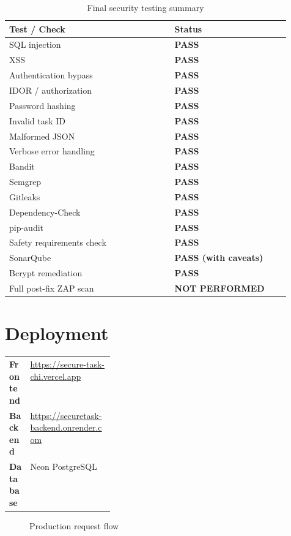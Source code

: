 \documentclass[11pt,a4paper]{article}
\newcommand{\tablehead}{\rowcolor{LightBlue}}
\newcommand{\pass}{\textcolor{PassGreen}{\textbf{PASS}}}
\newcommand{\passcav}{\textcolor{WarnAmber}{\textbf{PASS (with caveats)}}}
\newcommand{\notdone}{\textcolor{FailRed}{\textbf{NOT PERFORMED}}}
\begin{document}
\begin{table}[htbp]
\centering
\renewcommand{\arraystretch}{1.3}
\begin{tabular}{@{}L{0.5\linewidth}L{0.35\linewidth}@{}}
\toprule
\tablehead \textbf{Test / Check} & \textbf{Status} \\
\midrule
SQL injection & \pass \\
XSS & \pass \\
Authentication bypass & \pass \\
IDOR / authorization & \pass \\
Password hashing & \pass \\
Invalid task ID & \pass \\
Malformed JSON & \pass \\
Verbose error handling & \pass \\
\midrule
Bandit & \pass \\
Semgrep & \pass \\
Gitleaks & \pass \\
Dependency-Check & \pass \\
pip-audit & \pass \\
Safety requirements check & \pass \\
SonarQube & \passcav \\
Bcrypt remediation & \pass \\
Full post-fix ZAP scan & \notdone \\
\bottomrule
\end{tabular}
\caption{Final security testing summary}
\end{table}

\section{Deployment}

\begin{tabularx}{\linewidth}{@{}L{0.2\linewidth}X@{}}
\textbf{Frontend} & \url{https://secure-task-chi.vercel.app} \\
\textbf{Backend} & \url{https://securetask-backend.onrender.com} \\
\textbf{Database} & Neon PostgreSQL \\
\end{tabularx}

\vspace{0.4cm}
\begin{figure}[htbp]
\centering
{}
\caption{Production request flow}
\end{figure}
\end{document}
